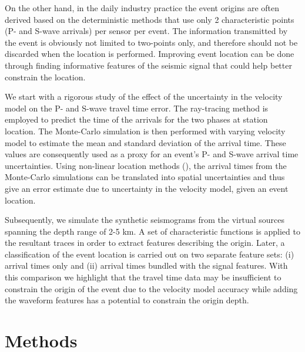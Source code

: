 \documentclass[letterpaper,11pt]{article}
\begin{document}
On the other hand, in the daily industry practice the event origins are often derived based on the deterministic methods that use only 2 characteristic points (P- and S-wave arrivals) per sensor per event. The information transmitted by the event is obviously not limited to two-points only, and therefore should not be discarded when the location is performed. Improving event location can be done through finding informative features of the seismic signal that could help better constrain the location. 


We start with a rigorous study of the effect of the uncertainty in the velocity model on the P- and S-wave travel time error. The ray-tracing method is employed to predict the time of the arrivals for the two phases at station location. The Monte-Carlo simulation is then performed with varying velocity model to estimate the mean and standard deviation of the arrival time. These values are consequently used as a proxy for an event's P- and S-wave arrival time uncertainties. Using non-linear location methods (\cite{lomax_precise_2001}), the arrival times from the Monte-Carlo simulations can be translated into spatial uncertainties and thus give an error estimate due to uncertainty in the velocity model, given an event location.


Subsequently, we simulate the synthetic seismograms from the virtual sources spanning the depth range of 2-5 km. A set of characteristic functions is applied to the resultant traces in order to extract features describing the origin. Later, a classification of the event location is carried out on two separate feature sets: (i) arrival times only and (ii) arrival times bundled with the signal features. With this comparison we highlight that the travel time data may be insufficient to constrain the origin of the event due to the velocity model accuracy while adding the waveform features has a potential to constrain the origin depth.

\section*{Methods}
\end{document}
